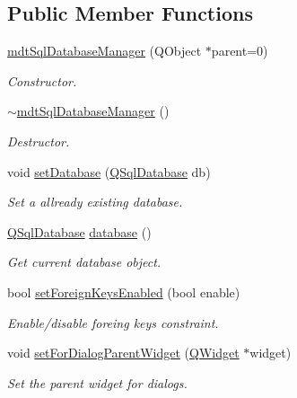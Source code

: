 \subsection*{Public Member Functions}
\begin{DoxyCompactItemize}
\item 
\hyperlink{classmdt_sql_database_manager_a8a9b487981f99ddc5d476776e5e0bb06}{mdt\-Sql\-Database\-Manager} (Q\-Object $\ast$parent=0)
\begin{DoxyCompactList}\small\item\em Constructor. \end{DoxyCompactList}\item 
\hyperlink{classmdt_sql_database_manager_affd97fb8d28d07617e860d748ff57c5f}{$\sim$mdt\-Sql\-Database\-Manager} ()
\begin{DoxyCompactList}\small\item\em Destructor. \end{DoxyCompactList}\item 
void \hyperlink{classmdt_sql_database_manager_a6c6f2b1a7754193e3a9b80069c8df747}{set\-Database} (\hyperlink{class_q_sql_database}{Q\-Sql\-Database} db)
\begin{DoxyCompactList}\small\item\em Set a allready existing database. \end{DoxyCompactList}\item 
\hyperlink{class_q_sql_database}{Q\-Sql\-Database} \hyperlink{classmdt_sql_database_manager_a54755f29b7cd87746e34a107e60241c5}{database} ()
\begin{DoxyCompactList}\small\item\em Get current database object. \end{DoxyCompactList}\item 
bool \hyperlink{classmdt_sql_database_manager_a40638df04f9e6eb3c5cee399a5543ffd}{set\-Foreign\-Keys\-Enabled} (bool enable)
\begin{DoxyCompactList}\small\item\em Enable/disable foreing keys constraint. \end{DoxyCompactList}\item 
void \hyperlink{classmdt_sql_database_manager_a3da56635b2a4db98b768e5846e15fa83}{set\-For\-Dialog\-Parent\-Widget} (\hyperlink{class_q_widget}{Q\-Widget} $\ast$widget)
\begin{DoxyCompactList}\small\item\em Set the parent widget for dialogs. \end{DoxyCompactList}\item 

\end{DoxyCompactItemize}
